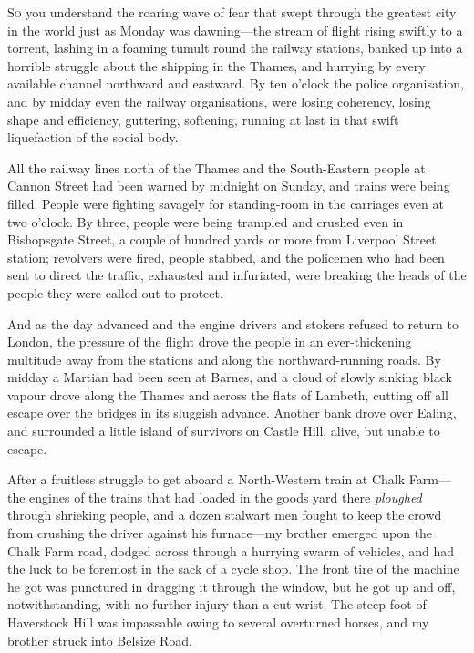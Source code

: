 



\lettrine[lines=4,findent=2pt]{S}{o} you understand the roaring wave of fear that swept through the greatest city in the world just as Monday was dawning—the stream of flight rising swiftly to a torrent, lashing in a foaming tumult round the railway stations, banked up into a horrible struggle about the shipping in the Thames, and hurrying by every available channel northward and eastward. By ten o'clock the police organisation, and by midday even the railway organisations, were losing coherency, losing shape and efficiency, guttering, softening, running at last in that swift liquefaction of the social body.

All the railway lines north of the Thames and the South-Eastern people at Cannon Street had been warned by midnight on Sunday, and trains were being filled. People were fighting savagely for standing-room in the carriages even at two o'clock. By three, people were being trampled and crushed even in Bishopsgate Street, a couple of hundred yards or more from Liverpool Street station; revolvers were fired, people stabbed, and the policemen who had been sent to direct the traffic, exhausted and infuriated, were breaking the heads of the people they were called out to protect.

And as the day advanced and the engine drivers and stokers refused to return to London, the pressure of the flight drove the people in an ever-thickening multitude away from the stations and along the northward-running roads. By midday a Martian had been seen at Barnes, and a cloud of slowly sinking black vapour drove along the Thames and across the flats of Lambeth, cutting off all escape over the bridges in its sluggish advance. Another bank drove over Ealing, and surrounded a little island of survivors on Castle Hill, alive, but unable to escape.

After a fruitless struggle to get aboard a North-Western train at Chalk Farm—the engines of the trains that had loaded in the goods yard there \textit{ploughed} through shrieking people, and a dozen stalwart men fought to keep the crowd from crushing the driver against his furnace—my brother emerged upon the Chalk Farm road, dodged across through a hurrying swarm of vehicles, and had the luck to be foremost in the sack of a cycle shop. The front tire of the machine he got was punctured in dragging it through the window, but he got up and off, notwithstanding, with no further injury than a cut wrist. The steep foot of Haverstock Hill was impassable owing to several overturned horses, and my brother struck into Belsize Road.

